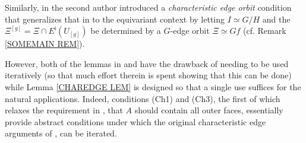 \documentclass[a4paper,10pt
,draft
]{article}%
\begin{document}
\begin{remark}
\begin{itemize}
Similarly, in \cite[Lemma 7.39]{Per17} the second author introduced a \textit{characteristic edge orbit} condition that generalizes that in \cite{MW09} to the equivariant context 
by letting $I \simeq G/H$
and the $\Xi^{[g]}=\Xi \cap E^{\mathsf{i}}(U_{[g]})$ be determined by a $G$-edge orbit $\Xi \simeq Gf$ (cf. Remark \ref{SOMEMAIN REM}).

However, both of the lemmas in \cite{MW09} and \cite{Per17}
have the drawback of needing to be used iteratively
(so that much effort therein is spent showing that this can be done) while Lemma \ref{CHAREDGE LEM} is designed so that a single use suffices for the natural applications.
Indeed, conditions (Ch1) and (Ch3), the first of which relaxes the requirement in \cite{MW09},\cite{Per17} that $A$ should contain all outer faces, essentially provide abstract conditions under which the original characteristic edge arguments of \cite{MW09},\cite{Per17} can be iterated.
%
\end{itemize}
\end{remark}
\end{document}
